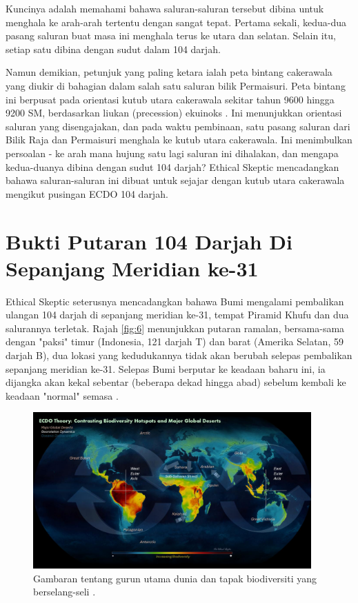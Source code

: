 \documentclass[10pt,twocolumn,letterpaper]{article}
\begin{document}
Kuncinya adalah memahami bahawa saluran-saluran tersebut dibina untuk menghala ke arah-arah tertentu dengan sangat tepat. Pertama sekali, kedua-dua pasang saluran buat masa ini menghala terus ke utara dan selatan. Selain itu, setiap satu dibina dengan sudut dalam 104 darjah.

Namun demikian, petunjuk yang paling ketara ialah peta bintang cakerawala yang diukir di bahagian dalam salah satu saluran bilik Permaisuri. Peta bintang ini berpusat pada orientasi kutub utara cakerawala sekitar tahun 9600 hingga 9200 SM, berdasarkan liukan (precession) ekuinoks \cite{28}. Ini menunjukkan orientasi saluran yang disengajakan, dan pada waktu pembinaan, satu pasang saluran dari Bilik Raja dan Permaisuri menghala ke kutub utara cakerawala. Ini menimbulkan persoalan - ke arah mana hujung satu lagi saluran ini dihalakan, dan mengapa kedua-duanya dibina dengan sudut 104 darjah? Ethical Skeptic mencadangkan bahawa saluran-saluran ini dibuat untuk sejajar dengan kutub utara cakerawala mengikut pusingan ECDO 104 darjah.

\section{Bukti Putaran 104 Darjah Di Sepanjang Meridian ke-31}

Ethical Skeptic seterusnya mencadangkan bahawa Bumi mengalami pembalikan ulangan 104 darjah di sepanjang meridian ke-31, tempat Piramid Khufu dan dua salurannya terletak. Rajah \ref{fig:6} menunjukkan putaran ramalan, bersama-sama dengan "paksi" timur (Indonesia, 121 darjah T) dan barat (Amerika Selatan, 59 darjah B), dua lokasi yang kedudukannya tidak akan berubah selepas pembalikan sepanjang meridian ke-31. Selepas Bumi berputar ke keadaan baharu ini, ia dijangka akan kekal sebentar (beberapa dekad hingga abad) sebelum kembali ke keadaan "normal" semasa \cite{150}.

\begin{figure}[t]
\begin{center}
\includegraphics[width=0.95\textwidth]{biodiversity.jpg}
\end{center}
   \caption{Gambaran tentang gurun utama dunia dan tapak biodiversiti yang berselang-seli \cite{28}.}
\label{fig:9}
\end{figure}
\end{document}
